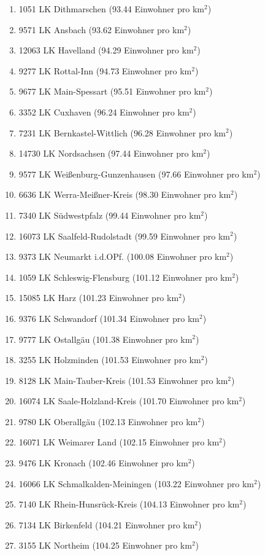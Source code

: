 \begin{enumerate}[itemsep=-6mm]
\item 1051 LK Dithmarschen (93.44 Einwohner pro km$^2$)
\item 9571 LK Ansbach (93.62 Einwohner pro km$^2$)
\item 12063 LK Havelland (94.29 Einwohner pro km$^2$)
\item 9277 LK Rottal-Inn (94.73 Einwohner pro km$^2$)
\item 9677 LK Main-Spessart (95.51 Einwohner pro km$^2$)
\item 3352 LK Cuxhaven (96.24 Einwohner pro km$^2$)
\item 7231 LK Bernkastel-Wittlich (96.28 Einwohner pro km$^2$)
\item 14730 LK Nordsachsen (97.44 Einwohner pro km$^2$)
\item 9577 LK Weißenburg-Gunzenhausen (97.66 Einwohner pro km$^2$)
\item 6636 LK Werra-Meißner-Kreis (98.30 Einwohner pro km$^2$)
\item 7340 LK Südwestpfalz (99.44 Einwohner pro km$^2$)
\item 16073 LK Saalfeld-Rudolstadt (99.59 Einwohner pro km$^2$)
\item 9373 LK Neumarkt i.d.OPf. (100.08 Einwohner pro km$^2$)
\item 1059 LK Schleswig-Flensburg (101.12 Einwohner pro km$^2$)
\item 15085 LK Harz (101.23 Einwohner pro km$^2$)
\item 9376 LK Schwandorf (101.34 Einwohner pro km$^2$)
\item 9777 LK Ostallgäu (101.38 Einwohner pro km$^2$)
\item 3255 LK Holzminden (101.53 Einwohner pro km$^2$)
\item 8128 LK Main-Tauber-Kreis (101.53 Einwohner pro km$^2$)
\item 16074 LK Saale-Holzland-Kreis (101.70 Einwohner pro km$^2$)
\item 9780 LK Oberallgäu (102.13 Einwohner pro km$^2$)
\item 16071 LK Weimarer Land (102.15 Einwohner pro km$^2$)
\item 9476 LK Kronach (102.46 Einwohner pro km$^2$)
\item 16066 LK Schmalkalden-Meiningen (103.22 Einwohner pro km$^2$)
\item 7140 LK Rhein-Hunsrück-Kreis (104.13 Einwohner pro km$^2$)
\item 7134 LK Birkenfeld (104.21 Einwohner pro km$^2$)
\item 3155 LK Northeim (104.25 Einwohner pro km$^2$)

\end{enumerate}
